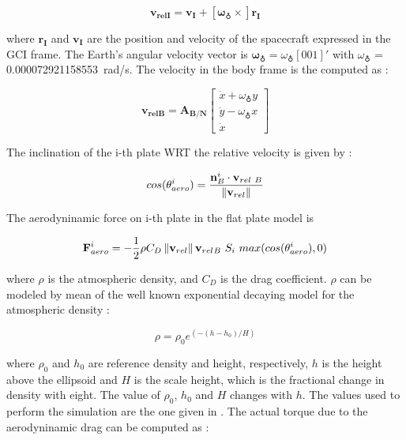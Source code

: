 \documentclass[11pt,a4paper]{report}
\begin{document}
\begin{equation}
 \mathbf{v_{relI}} =  \mathbf{v_I} + [\mathbf{\omega_{\earth} \times}] \mathbf{r_I}
\end{equation}

where $\mathbf{r_I}$ and $\mathbf{v_I}$ are the position and velocity of the spacecraft expressed in the GCI frame. 
The Earth’s angular velocity vector is $\mathbf{\omega_{\earth}} = \omega_{\earth}[0 0 1]'$ with $\omega_{\earth}$ = \SI{0.000072921158553}{\radian/\second}.
The velocity in the body frame is the computed as : 

\begin{equation}
 \mathbf{v_{relB}} = \mathbf{A_{B/N}}   \begin{bmatrix} \dot{x} + \omega_{\earth} y \\ \dot{y} - \omega_{\earth} x \\ \dot{x} \end{bmatrix}
\end{equation}

The inclination of the i-th plate WRT the relative velocity is given by : 

\begin{equation}
 cos(\theta_{aero}^{i}) = \frac{\mathbf{n}_{B}^{i} \cdot \mathbf{v}_{rel\ B}}{\norm{\mathbf{v}_{rel}}}
\end{equation}

The aerodyninamic force on i-th plate in the flat plate model is

\begin{equation}
 \mathbf{F}_{aero}^{i} = - \frac{1}{2} \rho C_{D} \norm{\mathbf{v}_{rel}} \mathbf{v}_{rel_{} B}\ S_{i}\ max(cos(\theta_{aero}^{i}),0)
\end{equation}

where $\rho$ is the atmospheric density, and $C_D$ is the drag coefficient.  
$\rho$ can be modeled by mean of the well known exponential decaying model for the atmospheric density :

\begin{equation}
 \rho = \rho_{0} e^{(-(h-h_{0})/H)}
\end{equation}

where $\rho_{0}$ and $h_{0}$ are reference density and height, respectively, $h$ is the height above the ellipsoid and $H$ is the scale height, which is the fractional change in density with eight.
The value of $\rho_{0}$, $h_{0}$  and $H$ changes with $h$. 
The values used to perform the simulation are the one given in \cite{Ref:Books:Fundamentals}.
The actual torque due to the aerodyninamic drag can be computed as : 
\end{document}
